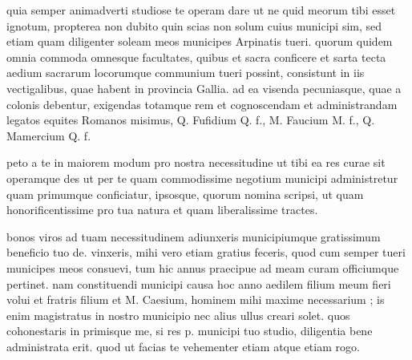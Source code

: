 


 quia semper animadverti studiose te operam dare ut ne quid meorum tibi esset ignotum, propterea non dubito quin scias non solum cuius municipi sim, sed etiam quam diligenter soleam meos municipes Arpinatis tueri. quorum quidem omnia commoda omnesque facultates, quibus et sacra conficere et sarta tecta aedium sacrarum locorumque communium tueri possint, consistunt in iis vectigalibus, quae habent in provincia Gallia. ad ea visenda pecuniasque, quae a colonis debentur, exigendas totamque rem et cognoscendam et administrandam legatos equites Romanos misimus, Q. Fufidium Q. f., M. Faucium M. f., Q. Mamercium Q. f.

 peto a te in maiorem modum pro nostra necessitudine ut tibi ea res curae sit operamque des ut per te quam commodissime negotium municipi administretur quam primumque conficiatur, ipsosque, quorum nomina scripsi, ut quam honorificentissime pro tua natura et quam liberalissime tractes.

 bonos viros ad tuam necessitudinem adiunxeris municipiumque gratissimum beneficio tuo de. vinxeris, mihi vero etiam gratius feceris, quod cum semper tueri municipes meos consuevi, tum hic annus praecipue ad meam curam officiumque pertinet. nam constituendi municipi causa hoc anno aedilem filium meum fieri volui et fratris filium et M. Caesium, hominem mihi maxime necessarium ; is enim magistratus in nostro municipio nec alius ullus creari solet. quos cohonestaris in primisque me, si res p. municipi tuo studio, diligentia bene administrata erit. quod ut facias te vehementer etiam atque etiam rogo.
